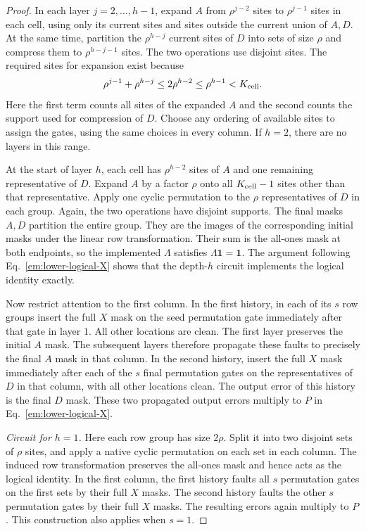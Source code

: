 \documentclass[aps,prl,reprint,longbibliography,nofootinbib,nobibnotes]{revtex4-2}
\begin{document}
\begin{proof}
In each layer $j=2,\ldots,h-1$, expand $A$ from $\rho^{j-2}$ sites to $\rho^{j-1}$ sites in each
cell, using only its current sites and sites outside the current union of $A,D$. At the same time,
partition the $\rho^{h-j}$ current sites of $D$ into sets of size $\rho$ and compress them to
$\rho^{h-j-1}$ sites. The two operations use disjoint sites. The required sites for expansion exist
because
\[
 \rho^{j-1}+\rho^{h-j}
 \le 2\rho^{h-2}\le\rho^{h-1}<K_{\rm cell}.
\]
Here the first term counts all sites of the expanded $A$ and the second counts the support used for
compression of $D$. Choose any ordering of available sites to assign the gates, using the same
choices in every column. If $h=2$, there are no layers in this range.

At the start of layer $h$, each cell has $\rho^{h-2}$ sites of $A$ and one remaining representative
of $D$. Expand $A$ by a factor $\rho$ onto all $K_{\rm cell}-1$ sites other than that
representative. Apply one cyclic permutation to the $\rho$ representatives of $D$ in each group.
Again, the two operations have disjoint supports. The final masks $A,D$ partition the entire group.
They are the images of the corresponding initial masks under the linear row transformation. Their
sum is the all-ones mask at both endpoints, so the implemented $\Lambda$ satisfies $\Lambda\mathbf
1=\mathbf 1$. The argument following Eq.~\eqref{em:lower-logical-X} shows that the depth-$h$
circuit implements the logical identity exactly.

Now restrict attention to the first column. In the first history, in each of its $s$ row groups
insert the full $X$ mask on the seed permutation gate immediately after that gate in layer $1$. All
other locations are clean. The first layer preserves the initial $A$ mask. The subsequent layers
therefore propagate these faults to precisely the final $A$ mask in that column. In the second
history, insert the full $X$ mask immediately after each of the $s$ final permutation gates on the
representatives of $D$ in that column, with all other locations clean. The output error of this
history is the final $D$ mask. These two propagated output errors multiply to $P$ in
Eq.~\eqref{em:lower-logical-X}.

\emph{Circuit for $h=1$.}
Here each row group has size $2\rho$. Split it into two disjoint sets of $\rho$ sites, and apply a
native cyclic permutation on each set in each column. The induced row transformation preserves the
all-ones mask and hence acts as the logical identity. In the first column, the first history faults
all $s$ permutation gates on the first sets by their full $X$ masks. The second history faults the
other $s$ permutation gates by their full $X$ masks. The resulting errors again multiply to $P$.
This construction also applies when $s=1$.


\end{proof}
\end{document}
